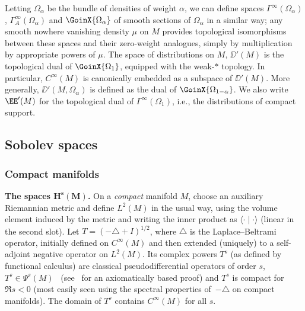  Letting $\Omega_\alpha$ be the bundle of densities of weight $\alpha$, we can define spaces $\Gamma^\infty(\Omega_\alpha)$,
 $\Gamma_A^\infty(\Omega_\alpha)$ and $\GoinX{\Omega_\alpha}$ of smooth sections
 of $\Omega_\alpha$ in a similar way; any smooth nowhere vanishing density $\mu$ on
 $M$ provides topological isomorphisms between these spaces and their zero-weight analogues, simply by multiplication by appropriate powers of $\mu$. The space of distributions on $M$, $\DD'(M)$ is the topological dual of $\GoinX{\Omega_1}$,
 equipped with the weak-$*$ topology. In particular, $C^\infty(M)$ is canonically embedded as a subspace of $\DD'(M)$. More generally,
 $\DD'(M,\Omega_\alpha)$ is defined as the dual of $\GoinX{\Omega_{1-\alpha}}$.
 We also write $\EE'(M)$ for the topological dual of $\Gamma^\infty(\Omega_1)$, i.e.,
 the distributions of compact support.


 \subsection{Sobolev spaces}

 \subsubsection{Compact manifolds}

 {\bf The spaces $\mathbf{H^s(M)}$.}
 On a \emph{compact} manifold $M$, choose an auxiliary Riemannian metric and define $L^2(M)$ in the usual way, using the volume element induced by the metric and writing the inner product as $\langle\cdot\mid\cdot\rangle$ (linear in the second slot). Let $T=(-\triangle + I)^{1/2}$, where $\triangle$ is the Laplace--Beltrami operator, initially defined on $C^\infty(M)$ and then extended (uniquely) to a self-adjoint negative operator on $L^2(M)$.
 Its complex powers $T^s$ (as defined by functional calculus) are classical pseudodifferential operators of order $s$, $T^s\in\Psi^s(M)$~\cite{Seeley:1967} (see~\cite{Amman_etal:2004} for an axiomatically based proof) and $T^s$ is compact for $\Re s<0$ (most easily seen using the spectral properties of~$-\triangle$ on compact manifolds). The domain of $T^s$ contains $C^\infty(M)$ for all $s$.

